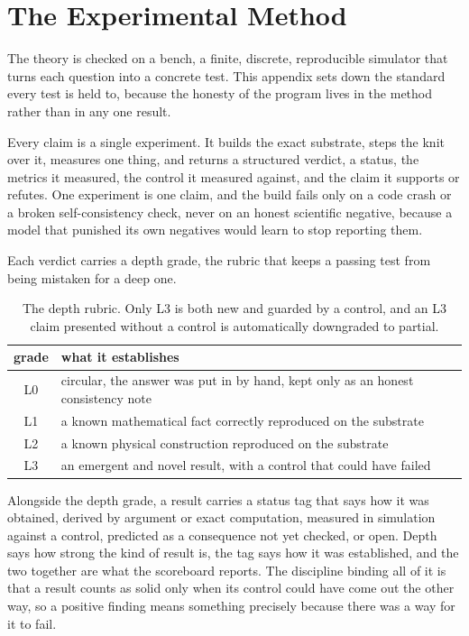 \section{The Experimental Method}
\label{app:method}

The theory is checked on a bench, a finite, discrete, reproducible simulator that turns each question into a concrete test. This appendix sets down the standard every test is held to, because the honesty of the program lives in the method rather than in any one result.

Every claim is a single experiment. It builds the exact substrate, steps the knit over it, measures one thing, and returns a structured verdict, a status, the metrics it measured, the control it measured against, and the claim it supports or refutes. One experiment is one claim, and the build fails only on a code crash or a broken self-consistency check, never on an honest scientific negative, because a model that punished its own negatives would learn to stop reporting them.

Each verdict carries a depth grade, the rubric that keeps a passing test from being mistaken for a deep one.

\begin{table}[ht]
\centering
\begin{tabular}{@{}cp{}@{}}
\toprule
grade & what it establishes \\
\midrule
L0 & circular, the answer was put in by hand, kept only as an honest consistency note \\
L1 & a known mathematical fact correctly reproduced on the substrate \\
L2 & a known physical construction reproduced on the substrate \\
L3 & an emergent and novel result, with a control that could have failed \\
\bottomrule
\end{tabular}
\caption{The depth rubric. Only L3 is both new and guarded by a control, and an L3 claim presented without a control is automatically downgraded to partial.}
\label{tab:rubric}
\end{table}

Alongside the depth grade, a result carries a status tag that says how it was obtained, derived by argument or exact computation, measured in simulation against a control, predicted as a consequence not yet checked, or open. Depth says how strong the kind of result is, the tag says how it was established, and the two together are what the scoreboard reports. The discipline binding all of it is that a result counts as solid only when its control could have come out the other way, so a positive finding means something precisely because there was a way for it to fail.

